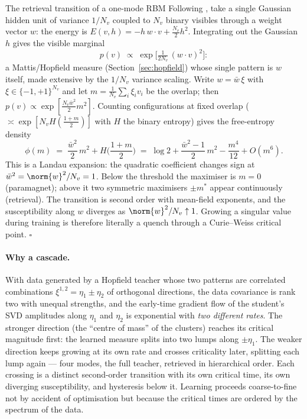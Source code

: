 \begin{toolbox}{The retrieval transition of a one-mode RBM}
Following \citet{bachtis2024cascade}, take a single Gaussian hidden unit of
variance $1/N_v$ coupled to $N_v$ binary visibles through a weight vector
$w$: the energy is $E(v, h) = -h\, w \cdot v + \tfrac{N_v}{2} h^2$.
Integrating out the Gaussian $h$ gives the visible marginal
\begin{equation*}
  p(v) \;\propto\; \exp\!\Big[ \tfrac{1}{2 N_v}\, (w \cdot v)^2 \Big] :
\end{equation*}
a Mattis/Hopfield measure (Section~\ref{sec:hopfield}) whose single
pattern is $w$ itself, made extensive by the $1/N_v$ variance scaling.
Write $w = \bar w\, \xi$ with $\xi \in \{-1,+1\}^{N_v}$ and let
$m = \tfrac{1}{N_v} \sum_i \xi_i v_i$ be the overlap; then
$p(v) \propto \exp[\tfrac{N_v \bar w^2}{2} m^2]$. Counting configurations
at fixed overlap ($\asymp \exp[N_v H(\tfrac{1+m}{2})]$ with $H$ the binary
entropy) gives the free-entropy density
\begin{equation*}
  \phi(m) \;=\; \frac{\bar w^2}{2}\, m^2 + H\!\Big(\frac{1+m}{2}\Big)
  \;=\; \log 2 + \frac{\bar w^2 - 1}{2}\, m^2 - \frac{m^4}{12} + O(m^6).
\end{equation*}
This is a Landau expansion: the quadratic coefficient changes sign at
$\bar w^2 = \norm{w}^2 / N_v = 1$. Below the threshold the maximiser is
$m = 0$ (paramagnet); above it two symmetric maximisers $\pm m^*$ appear
continuously (retrieval). The transition is second order with mean-field
exponents, and the susceptibility along $w$ diverges as
$\norm{w}^2/N_v \uparrow 1$. Growing a singular value during training is
therefore literally a quench through a Curie--Weiss critical point.
\hfill$\square$
\end{toolbox}

\paragraph{Why a cascade.} With data generated by a Hopfield teacher whose
two patterns are correlated combinations $\xi^{1,2} = \eta_1 \pm \eta_2$ of
orthogonal directions, the data covariance is rank two with unequal
strengths, and the early-time gradient flow of the student's SVD amplitudes
along $\eta_1$ and $\eta_2$ is exponential with \emph{two different rates}.
The stronger direction (the ``centre of mass'' of the clusters) reaches its
critical magnitude first: the learned measure splits into two lumps along
$\pm\eta_1$. The weaker direction keeps growing at its own rate and
crosses criticality later, splitting each lump again --- four modes, the
full teacher, retrieved in hierarchical order. Each crossing is a distinct
second-order transition with its own critical time, its own diverging
susceptibility, and hysteresis below it. Learning proceeds coarse-to-fine
not by accident of optimisation but because the critical times are ordered
by the spectrum of the data.


